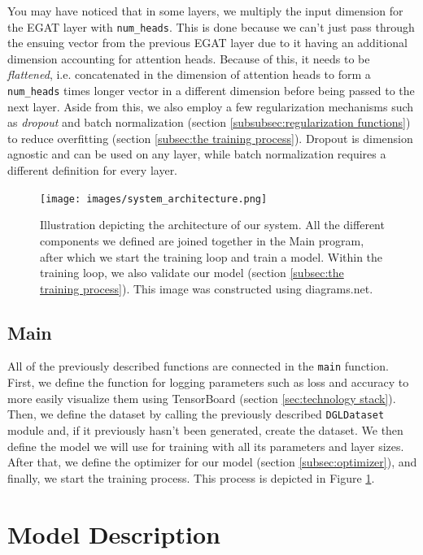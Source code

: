 \documentclass[times, utf8, diplomski, english]{fer_eng}
\begin{document}
You may have noticed that in some layers, we multiply the input dimension for the EGAT layer with \texttt{num\_heads}. This is done because we can't just pass through the ensuing vector from the previous EGAT layer due to it having an additional dimension accounting for attention heads. Because of this, it needs to be \textit{flattened}, i.e. concatenated in the dimension of attention heads to form a \texttt{num\_heads} times longer vector in a different dimension before being passed to the next layer. Aside from this, we also employ a few regularization mechanisms such as \textit{dropout} and batch normalization (section \ref{subsubsec:regularization functions}) to reduce overfitting (section \ref{subsec:the training process}). Dropout is dimension agnostic and can be used on any layer, while batch normalization requires a different definition for every layer.

\begin{figure}
	\centering
	\texttt{[image: images/system\_architecture.png]}
	\caption[Architecture]{Illustration depicting the architecture of our system. All the different components we defined are joined together in the Main program, after which we start the training loop and train a model. Within the training loop, we also validate our model (section \ref{subsec:the training process}). This image was constructed using diagrams.net\footnotemark{}.}
	\label{fig:architecture}
\end{figure}

\subsection{Main}

All of the previously described functions are connected in the \texttt{main} function. First, we define the function for logging parameters such as loss and accuracy to more easily visualize them using TensorBoard (section \ref{sec:technology stack}). Then, we define the dataset by calling the previously described \texttt{DGLDataset} module and, if it previously hasn't been generated, create the dataset. We then define the model we will use for training with all its parameters and layer sizes. After that, we define the optimizer for our model (section \ref{subsec:optimizer}), and finally, we start the training process. This process is depicted in Figure \ref{fig:architecture}.

\section{Model Description}
\label{sec:model description}
\end{document}

